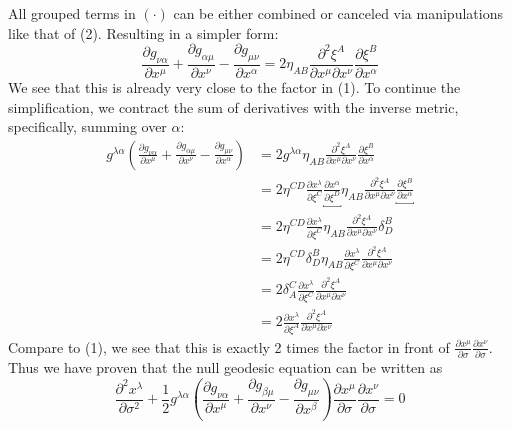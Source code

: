 \documentclass{article}
\begin{document}
All grouped terms in $(\cdot)$ can be either combined or canceled  via manipulations 
like that of (2). Resulting in a simpler form:
\[
\frac{\partial g_{\nu\alpha}}{\partial x^\mu}
+ \frac{\partial g_{\alpha\mu}}{\partial x^\nu}
- \frac{\partial g_{\mu\nu}}{\partial x^\alpha}
=
2\eta_{AB}\frac{\partial^2 \xi^A}{\partial x^\mu \partial x^\nu}\frac{\partial \xi^B}{\partial x^\alpha}
\]
We see that this is already very close to the factor in (1). To continue the simplification, 
we contract the sum of derivatives with the inverse metric, specifically, summing over $\alpha$:
\begin{align*}
g^{\lambda\alpha}\left(\frac{\partial g_{\nu\alpha}}{\partial x^\mu}
+ \frac{\partial g_{\alpha\mu}}{\partial x^\nu}
- \frac{\partial g_{\mu\nu}}{\partial x^\alpha}\right)
&= 2 g^{\lambda\alpha} \eta_{AB}\frac{\partial^2 \xi^A}{\partial x^\mu \partial x^\nu}\frac{\partial \xi^B}{\partial x^\alpha} \\
&= 2 \eta^{CD} \frac{\partial x^\lambda}{\partial \xi^C} \underbracket{\frac{\partial x^\alpha}{\partial \xi^D}}
\eta_{AB}\frac{\partial^2 \xi^A}{\partial x^\mu \partial x^\nu} \underbracket{\frac{\partial \xi^B}{\partial x^\alpha}} \\
&= 2 \eta^{CD} \frac{\partial x^\lambda}{\partial \xi^C} 
\eta_{AB}\frac{\partial^2 \xi^A}{\partial x^\mu \partial x^\nu} \delta^{B}_{D} \\
&= 2 \eta^{CD} \delta^{B}_{D} \eta_{AB} \frac{\partial x^\lambda}{\partial \xi^C} 
\frac{\partial^2 \xi^A}{\partial x^\mu \partial x^\nu} \\
&= 2 \delta^{C}_{A}  \frac{\partial x^\lambda}{\partial \xi^C} 
\frac{\partial^2 \xi^A}{\partial x^\mu \partial x^\nu} \\
&= 2 \frac{\partial x^\lambda}{\partial \xi^A} 
\frac{\partial^2 \xi^A}{\partial x^\mu \partial x^\nu}
\end{align*}
Compare to (1), we see that this is exactly 2 times the factor in front of $\frac{\partial x^\mu}{\partial \sigma}
\frac{\partial x^\nu}{\partial \sigma}$. Thus we have proven that the null geodesic equation can 
be written as 
\[
\frac{\partial^2 x^\lambda}{\partial \sigma^2} + 
\frac{1}{2} g^{\lambda\alpha} \left( \frac{\partial g_{\nu\alpha}}{\partial x^\mu}
+\frac{\partial g_{\beta\mu}}{\partial x^\nu}
-\frac{\partial g_{\mu\nu}}{\partial x^\beta}\right)
\frac{\partial x^\mu}{\partial \sigma}
\frac{\partial x^\nu}{\partial \sigma}
 = 0
\]



\end{document}
